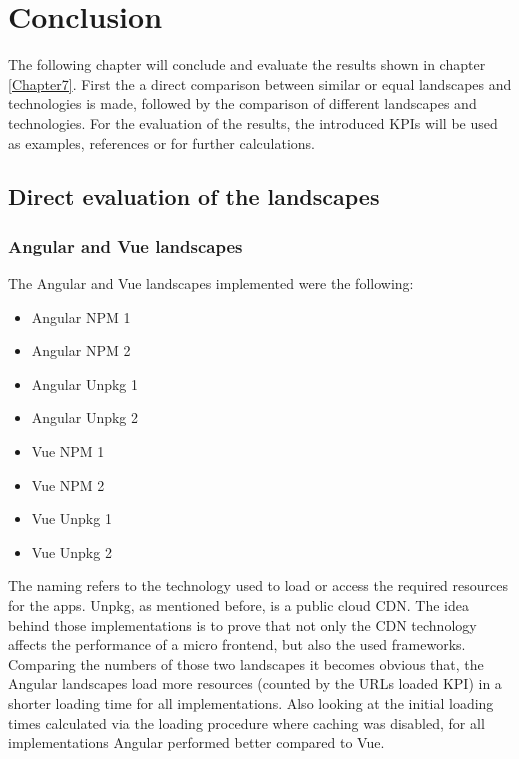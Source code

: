 \chapter{Conclusion} %
\label{Chapter8}


The following chapter will conclude and evaluate the results shown in chapter \ref{Chapter7}. First the a direct comparison between similar or equal landscapes and technologies is made, followed by the comparison of different landscapes and technologies.
For the evaluation of the results, the introduced KPIs will be used as examples, references or for further calculations.
 
\section{Direct evaluation of the landscapes}

\subsection{Angular and Vue landscapes}

The Angular and Vue landscapes implemented were the following:

\begin{itemize}[noitemsep]
	\item Angular NPM 1
	\item Angular NPM 2
	\item Angular Unpkg 1
	\item Angular Unpkg 2
	\item Vue NPM 1
	\item Vue NPM 2
	\item Vue Unpkg 1
	\item Vue Unpkg 2
\end{itemize}

The naming refers to the technology used to load or access the required resources for the apps. Unpkg, as mentioned before, is a public cloud CDN. The idea behind those implementations is to prove that not only the CDN technology affects the performance of a micro frontend, but also the used frameworks.
Comparing the numbers of those two landscapes it becomes obvious that, the Angular landscapes load more resources (counted by the URLs loaded KPI) in a shorter loading time for all implementations. 
Also looking at the initial loading times calculated via the loading procedure where caching was disabled, for all implementations Angular performed better compared to Vue.

